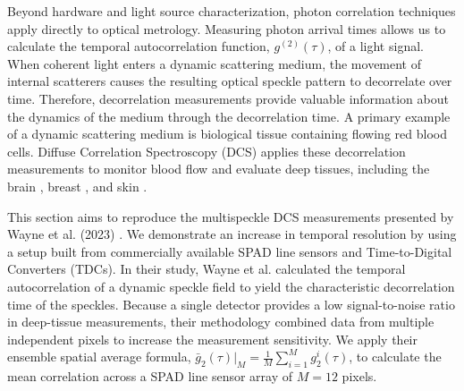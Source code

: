 
Beyond hardware and light source characterization, photon correlation techniques apply directly to optical metrology. 
Measuring photon arrival times allows us to calculate the temporal autocorrelation function, $g^{(2)}(\tau)$, of a light signal.
When coherent light enters a dynamic scattering medium, the movement of internal scatterers causes the resulting optical speckle pattern to decorrelate over time. 
Therefore, decorrelation measurements provide valuable information about the dynamics of the medium through the decorrelation time. 
A primary example of a dynamic scattering medium is biological tissue containing flowing red blood cells. 
Diffuse Correlation Spectroscopy (DCS) applies these decorrelation measurements to monitor blood flow and evaluate deep tissues, including the brain \cite{buckley2015decreased, rajaram2018simultaneous}, breast \cite{he2015noncontact, yazdi2017mapping}, and skin \cite{agochukwu2017novel}.

This section aims to reproduce the multispeckle DCS measurements presented by Wayne et al. (2023) \cite{wayne2023massively}. 
We demonstrate an increase in temporal resolution by using a setup built from commercially available SPAD line sensors and Time-to-Digital Converters (TDCs).
In their study, Wayne et al. calculated the temporal autocorrelation of a dynamic speckle field to yield the characteristic decorrelation time of the speckles.
Because a single detector provides a low signal-to-noise ratio in deep-tissue measurements, their methodology combined data from multiple independent pixels to increase the measurement sensitivity.
We apply their ensemble spatial average formula, $\bar{g}_2(\tau)|_M = \frac{1}{M}\sum_{i=1}^{M}g_2^i(\tau)$, to calculate the mean correlation across a SPAD line sensor array of $M = 12$ pixels.




